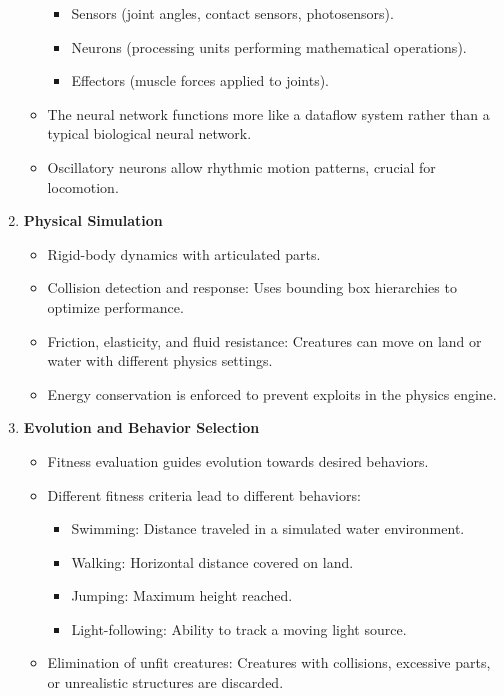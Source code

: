 \documentclass[12pt]{article}
\begin{document}
\begin{enumerate}[noitemsep]
\begin{itemize}[noitemsep]
        \begin{itemize}[noitemsep]
            \item Sensors (joint angles, contact sensors, photosensors).
            \item Neurons (processing units performing mathematical operations).
            \item Effectors (muscle forces applied to joints).
        \end{itemize}
        \item The neural network functions more like a dataflow system rather than a typical biological neural network.
        \item Oscillatory neurons allow rhythmic motion patterns, crucial for locomotion.
    \end{itemize}
    \item \textbf{Physical Simulation}
    \begin{itemize}[noitemsep]
        \item Rigid-body dynamics with articulated parts.
        \item Collision detection and response: Uses bounding box hierarchies to optimize performance.
        \item Friction, elasticity, and fluid resistance: Creatures can move on land or water with different physics settings.
        \item Energy conservation is enforced to prevent exploits in the physics engine.
    \end{itemize}
    \item \textbf{Evolution and Behavior Selection}
    \begin{itemize}[noitemsep]
        \item Fitness evaluation guides evolution towards desired behaviors.
        \item Different fitness criteria lead to different behaviors:
        \begin{itemize}[noitemsep]
            \item Swimming: Distance traveled in a simulated water environment.
            \item Walking: Horizontal distance covered on land.
            \item Jumping: Maximum height reached.
            \item Light-following: Ability to track a moving light source.
        \end{itemize}
        \item Elimination of unfit creatures: Creatures with collisions, excessive parts, or unrealistic structures are discarded.

\end{itemize}
\end{enumerate}
\end{document}
